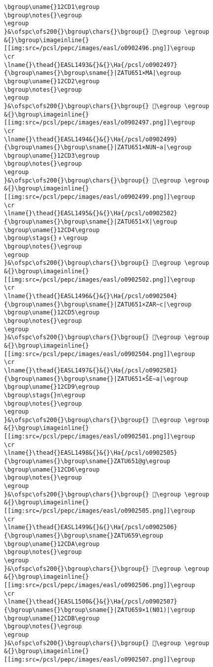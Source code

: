 \begin{verbatim}
\bgroup\uname{}12CD1\egroup
\bgroup\notes{}\egroup
\egroup
}&\ofspc\ofs200{}\bgroup\chars{}\bgroup{} 𒳑\egroup \egroup
&{}\bgroup\imageinline{}[[img:src=/pcsl/pepc/images/easl/o0902496.png]]\egroup
\cr
\lname{}\thead{}EASL1493&{}&{}\Ha{/pcsl/o0902497}{\bgroup\names{}\bgroup\sname{}|ZATU651×MA|\egroup
\bgroup\uname{}12CD2\egroup
\bgroup\notes{}\egroup
\egroup
}&\ofspc\ofs200{}\bgroup\chars{}\bgroup{} 𒳒\egroup \egroup
&{}\bgroup\imageinline{}[[img:src=/pcsl/pepc/images/easl/o0902497.png]]\egroup
\cr
\lname{}\thead{}EASL1494&{}&{}\Ha{/pcsl/o0902499}{\bgroup\names{}\bgroup\sname{}|ZATU651×NUN∼a|\egroup
\bgroup\uname{}12CD3\egroup
\bgroup\notes{}\egroup
\egroup
}&\ofspc\ofs200{}\bgroup\chars{}\bgroup{} 𒳓\egroup \egroup
&{}\bgroup\imageinline{}[[img:src=/pcsl/pepc/images/easl/o0902499.png]]\egroup
\cr
\lname{}\thead{}EASL1495&{}&{}\Ha{/pcsl/o0902502}{\bgroup\names{}\bgroup\sname{}|ZATU651×X|\egroup
\bgroup\uname{}12CD4\egroup
\bgroup\stags{}﹟\egroup
\bgroup\notes{}\egroup
\egroup
}&\ofspc\ofs200{}\bgroup\chars{}\bgroup{} 𒳔\egroup \egroup
&{}\bgroup\imageinline{}[[img:src=/pcsl/pepc/images/easl/o0902502.png]]\egroup
\cr
\lname{}\thead{}EASL1496&{}&{}\Ha{/pcsl/o0902504}{\bgroup\names{}\bgroup\sname{}|ZATU651×ZAR∼c|\egroup
\bgroup\uname{}12CD5\egroup
\bgroup\notes{}\egroup
\egroup
}&\ofspc\ofs200{}\bgroup\chars{}\bgroup{} 𒳕\egroup \egroup
&{}\bgroup\imageinline{}[[img:src=/pcsl/pepc/images/easl/o0902504.png]]\egroup
\cr
\lname{}\thead{}EASL1497&{}&{}\Ha{/pcsl/o0902501}{\bgroup\names{}\bgroup\sname{}|ZATU651×ŠE∼a|\egroup
\bgroup\uname{}12CD9\egroup
\bgroup\stags{}n\egroup
\bgroup\notes{}\egroup
\egroup
}&\ofspc\ofs200{}\bgroup\chars{}\bgroup{} 𒳙\egroup \egroup
&{}\bgroup\imageinline{}[[img:src=/pcsl/pepc/images/easl/o0902501.png]]\egroup
\cr
\lname{}\thead{}EASL1498&{}&{}\Ha{/pcsl/o0902505}{\bgroup\names{}\bgroup\sname{}ZATU651@g\egroup
\bgroup\uname{}12CD6\egroup
\bgroup\notes{}\egroup
\egroup
}&\ofspc\ofs200{}\bgroup\chars{}\bgroup{} 𒳖\egroup \egroup
&{}\bgroup\imageinline{}[[img:src=/pcsl/pepc/images/easl/o0902505.png]]\egroup
\cr
\lname{}\thead{}EASL1499&{}&{}\Ha{/pcsl/o0902506}{\bgroup\names{}\bgroup\sname{}ZATU659\egroup
\bgroup\uname{}12CDA\egroup
\bgroup\notes{}\egroup
\egroup
}&\ofspc\ofs200{}\bgroup\chars{}\bgroup{} 𒳚\egroup \egroup
&{}\bgroup\imageinline{}[[img:src=/pcsl/pepc/images/easl/o0902506.png]]\egroup
\cr
\lname{}\thead{}EASL1500&{}&{}\Ha{/pcsl/o0902507}{\bgroup\names{}\bgroup\sname{}|ZATU659×1(N01)|\egroup
\bgroup\uname{}12CDB\egroup
\bgroup\notes{}\egroup
\egroup
}&\ofspc\ofs200{}\bgroup\chars{}\bgroup{} 𒳛\egroup \egroup
&{}\bgroup\imageinline{}[[img:src=/pcsl/pepc/images/easl/o0902507.png]]\egroup

\end{verbatim}
